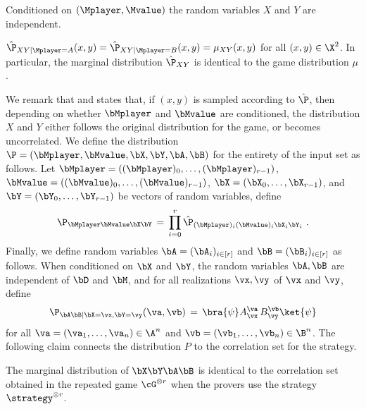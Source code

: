 \begin{claim}
	\label{clm:dependency-breaking-1}
	Conditioned on $(\Mplayer,\Mvalue)$ the random variables $X$ and $Y$ are independent. 
\end{claim}

\begin{claim}
	\label{clm:dependency-breaking-2}
	$\hat{\P}_{XY|\Mplayer = A}(x,y) = \hat{\P}_{XY|\Mplayer=B}(x,y) = \mu_{XY}(x,y)$ for all $(x,y) \in \X^2$. In particular, the marginal distribution $\hat{\P}_{XY}$ is identical to the game distribution $\mu$. 
\end{claim}

We remark that  and  states that, if $(x,y)$ is sampled according to $\hat{\P}$, then depending on whether $\bMplayer$ and $\bMvalue$ are conditioned, the distribution $X$ and $Y$ either follows the original distribution for the game, or becomes uncorrelated. We define the distribution $\P = (\bMplayer, \bMvalue, \bX, \bY, \bA, \bB)$ for the entirety of the input set as follows. Let $\bMplayer = ((\bMplayer)_0,\ldots,(\bMplayer)_{r-1})$, $\bMvalue= ((\bMvalue)_0,\ldots,(\bMvalue)_{r-1})$, $\bX = (\bX_0,\ldots,\bX_{r-1})$, and $\bY = (\bY_0,\ldots,\bY_{r-1})$ be vectors of random variables, define
\[
\P_{\bMplayer \bMvalue \bX \bY} \,=\, \prod_{i=0}^r \hat{\P}_{(\bMplayer)_i (\bMvalue)_i \bX_i \bY_i}~.
\]
Finally, we define random variables $\bA = (\bA_i)_{i \in [r]}$ and $\bB = (\bB_i)_{i \in [r]}$ as follows. When conditioned on $\bX$ and $\bY$, the random variables $\bA,\bB$ are independent of $\bD$ and $\bM$, and for all realizations $\vx, \vy$ of $\vx$ and $\vy$, define
\[
\P_{\bA \bB | \bX = \vx, \bY = \vy}(\va,\vb) \,=\, \bra{\psi} A_\vx^\va \, B_\vy^\vb  \ket{\psi}
\]
for all $\va = (\va_1,\ldots,\va_n) \in \A^n$ and $\vb = (\vb_1,\ldots,\vb_n) \in \B^n$. The following claim connects the distribution $P$ to the correlation set for the strategy. 

\begin{claim}\label{claim:abxy}
	The marginal distribution of $\bX \bY \bA \bB$ is identical to the correlation set obtained in the repeated game $\cG^{\otimes r}$ when the provers use the strategy $\strategy^{\otimes r}$.
\end{claim}

